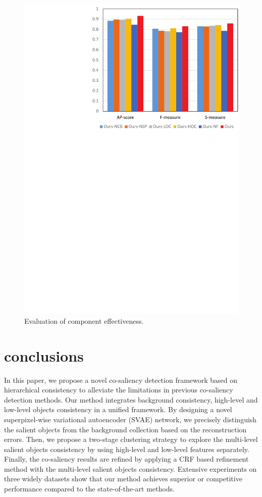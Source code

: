 \documentclass[sigconf]{acmart}
\begin{document}
\begin{figure}[!h]
\centering
\includegraphics[scale=0.6]{Fig71.pdf}
\caption{Evaluation of component effectiveness.}
\label{fig:label}
\end{figure}

\section{conclusions}
In this paper, we propose a novel co-saliency detection framework based on hierarchical consistency to alleviate the limitations in previous co-saliency detection methods. Our method integrates background consistency, high-level and low-level objects consistency in a unified framework. By designing a novel superpixel-wise variational autoencoder (SVAE) network, we precisely distinguish the salient objects from the background collection based on the reconstruction errors. Then, we propose a two-stage clustering strategy to explore the multi-level salient objects consistency by using high-level and low-level features separately. Finally, the co-saliency results are refined by applying a CRF based refinement method with the multi-level salient objects consistency. Extensive experiments on three widely datasets show that our method achieves superior or competitive performance compared to the state-of-the-art methods.















% 
\end{document}
